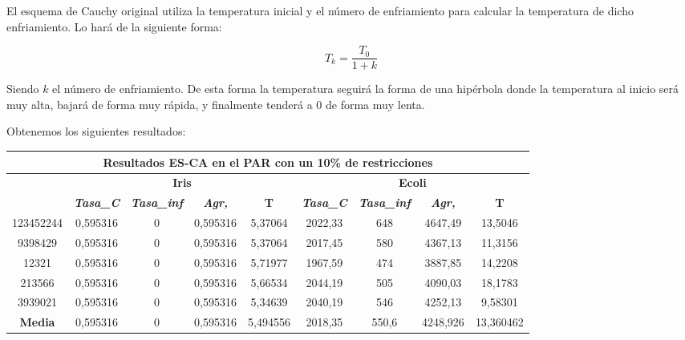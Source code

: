 \documentclass[12pt, spanish]{article}
\begin{document}
El esquema de Cauchy original utiliza la temperatura inicial y el número de enfriamiento para calcular la temperatura de dicho enfriamiento. Lo hará de la siguiente forma:

$$ T_k = \frac{T_0}{1 + k} $$

Siendo $k$ el número de enfriamiento. De esta forma la temperatura seguirá la forma de una hipérbola donde la temperatura al inicio será muy alta, bajará de forma muy rápida, y finalmente tenderá a 0 de forma muy lenta.

Obtenemos los siguientes resultados:

\begin{table}[H]
\begin{tabular}{|c|c|c|c|c|c|c|c|c|}
\hline
\multicolumn{9}{|c|}{\textbf{Resultados ES-CA en el PAR con un 10\% de restricciones}}                                                                                                                            \\ \hline
\multirow{2}{*}{} & \multicolumn{4}{c|}{\textbf{Iris}}                                                            & \multicolumn{4}{c|}{\textbf{Ecoli}}                                                           \\ \cline{2-9} 
                  & \textit{\textbf{Tasa\_C}} & \textit{\textbf{Tasa\_inf}} & \textit{\textbf{Agr,}} & \textbf{T} & \textit{\textbf{Tasa\_C}} & \textit{\textbf{Tasa\_inf}} & \textit{\textbf{Agr,}} & \textbf{T} \\ \hline
123452244         & 0,595316                  & 0                           & 0,595316               & 5,37064    & 2022,33                   & 648                         & 4647,49                & 13,5046    \\ \hline
9398429           & 0,595316                  & 0                           & 0,595316               & 5,37064    & 2017,45                   & 580                         & 4367,13                & 11,3156    \\ \hline
12321             & 0,595316                  & 0                           & 0,595316               & 5,71977    & 1967,59                   & 474                         & 3887,85                & 14,2208    \\ \hline
213566            & 0,595316                  & 0                           & 0,595316               & 5,66534    & 2044,19                   & 505                         & 4090,03                & 18,1783    \\ \hline
3939021           & 0,595316                  & 0                           & 0,595316               & 5,34639    & 2040,19                   & 546                         & 4252,13                & 9,58301    \\ \hline
\textbf{Media}    & 0,595316                  & 0                           & 0,595316               & 5,494556   & 2018,35                   & 550,6                       & 4248,926               & 13,360462  \\ \hline
\end{tabular}
\end{table}
\end{document}
